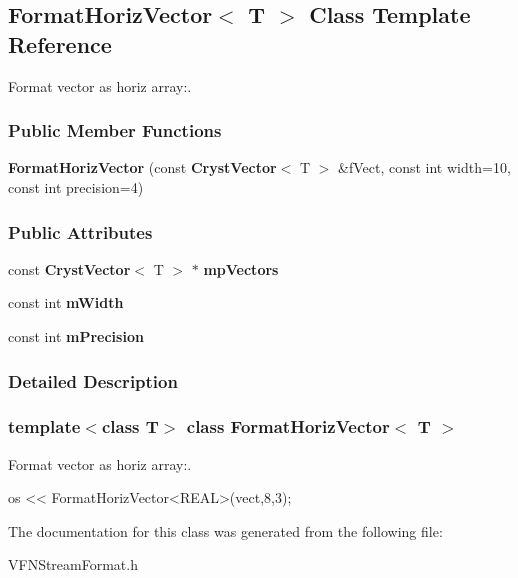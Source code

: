 \subsection{FormatHorizVector$<$ T $>$ Class Template Reference}
\label{a00029}


Format vector as horiz array:.  
\subsubsection*{Public Member Functions}
\begin{DoxyCompactItemize}
\item 
{\bfseries FormatHorizVector} (const {\bf CrystVector}$<$ T $>$ \&fVect, const int width=10, const int precision=4)\label{a00029_a547a7cbadc52884eb1d0149ab62f6715}

\end{DoxyCompactItemize}
\subsubsection*{Public Attributes}
\begin{DoxyCompactItemize}
\item 
const {\bf CrystVector}$<$ T $>$ $\ast$ {\bfseries mpVectors}\label{a00029_a73b7421467798780d9c1d67424b3a876}

\item 
const int {\bfseries mWidth}\label{a00029_a3142a01d912b28c5fb2ff261915d80ba}

\item 
const int {\bfseries mPrecision}\label{a00029_ac1ca600c08c0dd17acd9d1d5721d4b57}

\end{DoxyCompactItemize}


\subsubsection{Detailed Description}
\subsubsection*{template$<$class T$>$ class FormatHorizVector$<$ T $>$}

Format vector as horiz array:. 
\begin{DoxyCode}
 os << FormatHorizVector<REAL>(vect,8,3);
\end{DoxyCode}
 

The documentation for this class was generated from the following file:\begin{DoxyCompactItemize}
\item 
VFNStreamFormat.h\end{DoxyCompactItemize}
